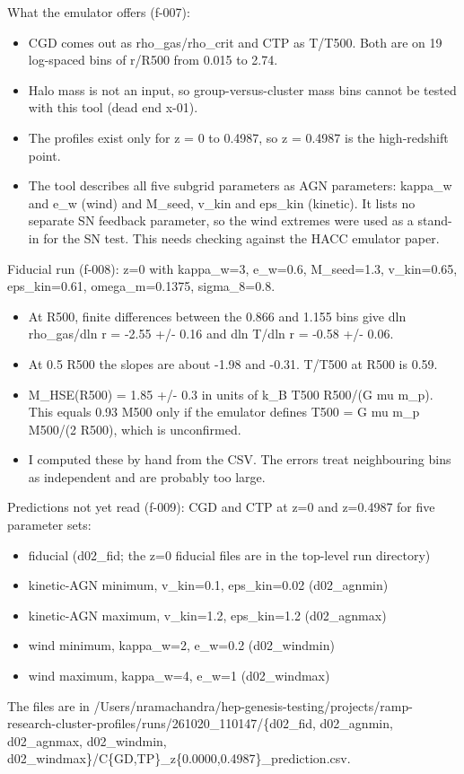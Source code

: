\documentclass[11pt,a4paper]{article}
\begin{document}
What the emulator offers (f-007):

\begin{itemize}
  \item CGD comes out as rho\_gas/rho\_crit and CTP as T/T500. Both are on 19 log-spaced bins of r/R500 from 0.015 to 2.74.
  \item Halo mass is not an input, so group-versus-cluster mass bins cannot be tested with this tool (dead end x-01).
  \item The profiles exist only for z = 0 to 0.4987, so z = 0.4987 is the high-redshift point.
  \item The tool describes all five subgrid parameters as AGN parameters: kappa\_w and e\_w (wind) and M\_seed, v\_kin and eps\_kin (kinetic). It lists no separate SN feedback parameter, so the wind extremes were used as a stand-in for the SN test. This needs checking against the HACC emulator paper.
\end{itemize}
Fiducial run (f-008): z=0 with kappa\_w=3, e\_w=0.6, M\_seed=1.3, v\_kin=0.65, eps\_kin=0.61, omega\_m=0.1375, sigma\_8=0.8.

\begin{itemize}
  \item At R500, finite differences between the 0.866 and 1.155 bins give dln rho\_gas/dln r = -2.55 +/- 0.16 and dln T/dln r = -0.58 +/- 0.06.
  \item At 0.5 R500 the slopes are about -1.98 and -0.31. T/T500 at R500 is 0.59.
  \item M\_HSE(R500) = 1.85 +/- 0.3 in units of k\_B T500 R500/(G mu m\_p). This equals 0.93 M500 only if the emulator defines T500 = G mu m\_p M500/(2 R500), which is unconfirmed.
  \item I computed these by hand from the CSV. The errors treat neighbouring bins as independent and are probably too large.
\end{itemize}
Predictions not yet read (f-009): CGD and CTP at z=0 and z=0.4987 for five parameter sets:

\begin{itemize}
  \item fiducial (d02\_fid; the z=0 fiducial files are in the top-level run directory)
  \item kinetic-AGN minimum, v\_kin=0.1, eps\_kin=0.02 (d02\_agnmin)
  \item kinetic-AGN maximum, v\_kin=1.2, eps\_kin=1.2 (d02\_agnmax)
  \item wind minimum, kappa\_w=2, e\_w=0.2 (d02\_windmin)
  \item wind maximum, kappa\_w=4, e\_w=1 (d02\_windmax)
\end{itemize}
The files are in /Users/nramachandra/hep-genesis-testing/projects/ramp-research-cluster-profiles/runs/261020\_110147/\{d02\_fid, d02\_agnmin, d02\_agnmax, d02\_windmin, d02\_windmax\}/C\{GD,TP\}\_z\{0.0000,0.4987\}\_prediction.csv.
\end{document}
